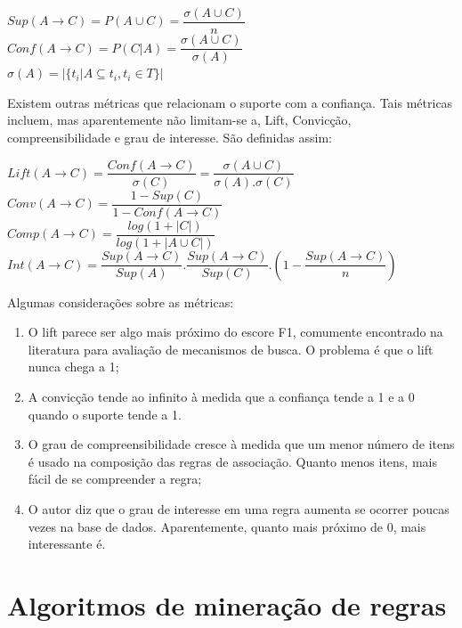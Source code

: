 \documentclass[12pt]{article}
\begin{document}
\begin{center}
    $Sup(A \rightarrow C) = P(A \cup C) = \dfrac{\sigma(A \cup C)}{n}$ \\[2.8ex]
    $Conf(A \rightarrow C) = P(C|A) = \dfrac{\sigma(A \cup C)}{\sigma(A)}$ \\[2.8ex]
    $\sigma(A) = |\{t_i| A \subseteq t_i, t_i \in T\}|$ \\
\end{center}

Existem outras métricas que relacionam o suporte com a confiança. Tais métricas
incluem, mas aparentemente não limitam-se a, Lift, Convicção,
compreensibilidade e grau de interesse. São definidas assim:

\begin{center}
    $Lift (A \rightarrow C) = \dfrac{Conf(A \rightarrow C)}{\sigma(C)} = \dfrac{\sigma(A \cup C)}{\sigma(A).\sigma(C)}$ \\[2.8ex]
    $Conv (A \rightarrow C) = \dfrac{1 - Sup(C)}{1-Conf(A \rightarrow C)}$ \\[2.8ex]
    $Comp (A \rightarrow C) = \dfrac{log(1+|C|)}{log(1+|A \cup C|)}$ \\[2.8ex]
    $Int (A \rightarrow C) = \dfrac{Sup(A \rightarrow C)}{Sup(A)}.\dfrac{Sup(A \rightarrow C)}{Sup(C)}.(1 - \dfrac{Sup(A \rightarrow C)}{n})$
\end{center}

Algumas considerações sobre as métricas:

\begin{enumerate}
    \item O lift parece ser algo mais próximo do escore F1, comumente encontrado na literatura para avaliação de mecanismos de busca. O problema é que o lift nunca chega a 1;
    \item A convicção tende ao infinito à medida que a confiança tende a 1 e a 0 quando o suporte tende a 1.
    \item O grau de compreensibilidade cresce à medida que um menor número de itens é usado na composição das regras de associação. Quanto menos itens, mais fácil de se compreender a regra;
    \item O autor diz que o grau de interesse em uma regra aumenta se ocorrer poucas vezes na base de dados. Aparentemente, quanto mais próximo de 0, mais interessante é.
\end{enumerate}

\section{Algoritmos de mineração de regras}
\end{document}
